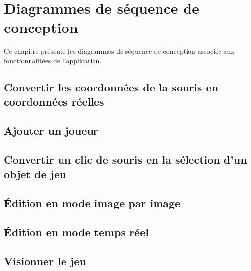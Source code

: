 
\chapter{Diagrammes de séquence de conception}
\label{s:sequence_conception}

Ce chapitre présente les diagrammes de séquence de conception associée aux fonctionnalitées de l'application.

\section{Convertir les coordonnées de la souris en coordonnées réelles}
\label{sec:convertir_coordonnees_souris}



\section{Ajouter un joueur}
\label{sec:ajouter_joueur}

\section{Convertir un clic de souris en la sélection d'un objet de jeu}
\label{convertir_clic_en_objet}

\section{Édition en mode image par image}
\label{sec:edition_image_par_image}

\section{Édition en mode temps réel}
\label{sec:edition_temps_reel}

\section{Visionner le jeu}
\label{sec:visionner_jeu}